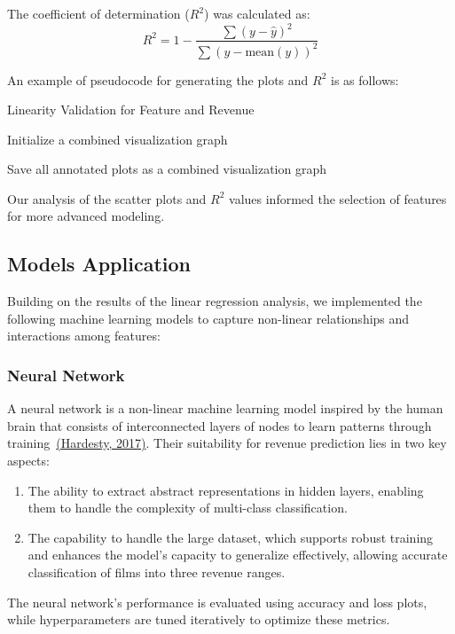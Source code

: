 \documentclass{article}
\begin{document}
The coefficient of determination (\( R^2 \)) was calculated as:
\[R^2 = 1 - \frac{\sum{(y - \hat{y})^2}}{\sum{(y - \text{mean}(y))^2}}\]

An example of pseudocode for generating the plots and \( R^2 \) is as follows:
\begin{algorithm}[H]
\caption{Linearity Validation for Feature and Revenue}\label{alg:linearity}
Initialize a combined visualization graph\;

Save all annotated plots as a combined visualization graph\;
\end{algorithm}

Our analysis of the scatter plots and \( R^2 \) values informed the selection of features for more advanced modeling.

\subsection{Models Application}
Building on the results of the linear regression analysis, we implemented the following machine learning models to capture non-linear relationships and interactions among features:

\subsubsection{Neural Network}
A neural network is a non-linear machine learning model inspired by the human brain that consists of interconnected layers of nodes to learn patterns through training~\hyperref[Hardesty2017]{(Hardesty, 2017)}. Their suitability for revenue prediction lies in two key aspects: 
\begin{enumerate}
    \item The ability to extract abstract representations in hidden layers, enabling them to handle the complexity of multi-class classification.
    \item The capability to handle the large dataset, which supports robust training and enhances the model's capacity to generalize effectively, allowing accurate classification of films into three revenue ranges.
\end{enumerate}
The neural network's performance is evaluated using accuracy and loss plots, while hyperparameters are tuned iteratively to optimize these metrics.
\end{document}

